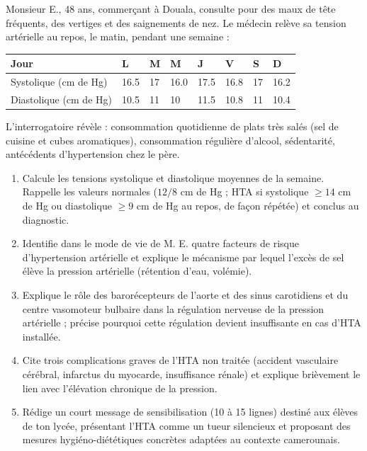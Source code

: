 \documentclass[11pt]{article}
\begin{document}
\begin{exercice}
Monsieur E., 48 ans, commerçant à Douala, consulte pour des maux de tête fréquents, des vertiges et des saignements de nez. Le médecin relève sa tension artérielle au repos, le matin, pendant une semaine :
\begin{center}
\begin{tabularx}{\linewidth}{|l|X|X|X|X|X|X|X|}\hline
\rowcolor{popblueL} Jour & L & M & M & J & V & S & D \\ \hline
Systolique (cm de Hg) & \num{16,5} & 17 & \num{16,0} & \num{17,5} & \num{16,8} & 17 & \num{16,2} \\ \hline
Diastolique (cm de Hg) & \num{10,5} & 11 & 10 & \num{11,5} & \num{10,8} & 11 & \num{10,4} \\ \hline
\end{tabularx}
\end{center}
L'interrogatoire révèle : consommation quotidienne de plats très salés (sel de cuisine et cubes aromatiques), consommation régulière d'alcool, sédentarité, antécédents d'hypertension chez le père.
\begin{enumerate}
\item Calcule les tensions systolique et diastolique moyennes de la semaine. Rappelle les valeurs normales ($12/8$ cm de Hg ; HTA si systolique $\geq 14$ cm de Hg ou diastolique $\geq 9$ cm de Hg au repos, de façon répétée) et conclus au diagnostic.
\item Identifie dans le mode de vie de M. E. quatre facteurs de risque d'hypertension artérielle et explique le mécanisme par lequel l'excès de sel élève la pression artérielle (rétention d'eau, volémie).
\item Explique le rôle des barorécepteurs de l'aorte et des sinus carotidiens et du centre vasomoteur bulbaire dans la régulation nerveuse de la pression artérielle ; précise pourquoi cette régulation devient insuffisante en cas d'HTA installée.
\item Cite trois complications graves de l'HTA non traitée (accident vasculaire cérébral, infarctus du myocarde, insuffisance rénale) et explique brièvement le lien avec l'élévation chronique de la pression.
\item Rédige un court message de sensibilisation (10 à 15 lignes) destiné aux élèves de ton lycée, présentant l'HTA comme un \og tueur silencieux \fg{} et proposant des mesures hygiéno-diététiques concrètes adaptées au contexte camerounais.
\end{enumerate}
\end{exercice}
\end{document}
